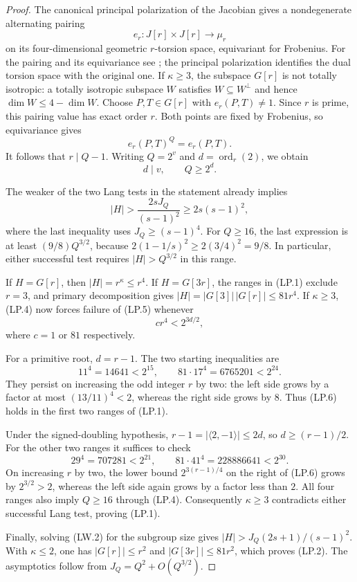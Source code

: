 \documentclass[11pt,a4paper]{article}
\begin{document}
\begin{proof}
The canonical principal polarization of the Jacobian gives a
nondegenerate alternating pairing
\[
                e_r:J[r]\times J[r]\longrightarrow\mu_r
\tag{LP.3}
\]
on its four-dimensional geometric $r$-torsion space, equivariant
for Frobenius.  For the pairing and its equivariance see
\cite[\S16, p.~29, and Lemma~16.2(e), p.~30]{MilneAV};
the principal polarization identifies the dual torsion space
with the original one.
If $\kappa\ge3$, the subspace $G[r]$ is not totally isotropic:
a totally isotropic subspace $W$ satisfies
$W\subseteq W^\perp$ and hence
$\dim W\le4-\dim W$.
Choose $P,T\in G[r]$ with $e_r(P,T)\ne1$.
Since $r$ is prime, this pairing value has exact order $r$.
Both points are fixed by Frobenius, so equivariance gives
\[
                         e_r(P,T)^Q=e_r(P,T).
\]
It follows that $r\mid Q-1$.
Writing $Q=2^v$ and $d=\operatorname{ord}_r(2)$, we obtain
\[
                         d\mid v,\qquad Q\ge2^d.
\tag{LP.4}
\]

The weaker of the two Lang tests in the statement already
implies
\[
 |H|>\frac{2sJ_Q}{(s-1)^2}
       \ge 2s(s-1)^2,
\tag{LP.5}
\]
where the last inequality uses $J_Q\ge(s-1)^4$.
For $Q\ge16$, the last expression is at least
$(9/8)Q^{3/2}$, because
$2(1-1/s)^2\ge2(3/4)^2=9/8$.
In particular, either successful test requires
$|H|>Q^{3/2}$ in this range.

If $H=G[r]$, then $|H|=r^\kappa\le r^4$.
If $H=G[3r]$, the ranges in (LP.1) exclude $r=3$, and
primary decomposition gives
$|H|=|G[3]|\,|G[r]|\le81r^4$.
If $\kappa\ge3$, (LP.4) now forces failure of (LP.5)
whenever
\[
                         c r^4<2^{3d/2},
\tag{LP.6}
\]
where $c=1$ or $81$ respectively.

For a primitive root, $d=r-1$.
The two starting inequalities are
\[
 11^4=14641<2^{15},\qquad
 81\cdot17^4=6765201<2^{24}.
\]
They persist on increasing the odd integer $r$ by two:
the left side grows by a factor at most
$(13/11)^4<2$, whereas the right side grows by $8$.
Thus (LP.6) holds in the first two ranges of (LP.1).

Under the signed-doubling hypothesis,
$r-1=|\langle2,-1\rangle|\le2d$, so
$d\ge(r-1)/2$.
For the other two ranges it suffices to check
\[
 29^4=707281<2^{21},\qquad
 81\cdot41^4=228886641<2^{30}.
\]
On increasing $r$ by two, the lower bound
$2^{3(r-1)/4}$ on the right of (LP.6) grows by
$2^{3/2}>2$, whereas the left side again grows by a
factor less than $2$.
All four ranges also imply $Q\ge16$ through (LP.4).
Consequently $\kappa\ge3$ contradicts either successful
Lang test, proving (LP.1).

Finally, solving (LW.2) for the subgroup size gives
$|H|>J_Q(2s+1)/(s-1)^2$.
With $\kappa\le2$, one has $|G[r]|\le r^2$ and
$|G[3r]|\le81r^2$, which proves (LP.2).
The asymptotics follow from $J_Q=Q^2+O(Q^{3/2})$.
\end{proof}
\end{document}
